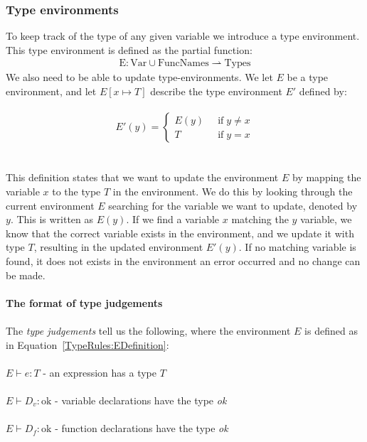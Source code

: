 \subsubsection{Type environments}
To keep track of the type of any given variable we introduce a type environment. This type environment is defined as the partial function:
\begin{align}\label{TypeRules:EDefinition}
    \text{E} : \text{Var} \cup \text{FuncNames} \rightharpoonup \text{Types}
\end{align}
We also need to be able to update type-environments. We let $E$ be a type environment, and let $E[x \mapsto T]$ describe the type environment $E'$ defined by:
\\\\
\begin{equation*}
    E'(y)=
    \begin{cases}
    E(y) \;\; &\text{if} \; y \neq x\\
    T \;\;    &\text{if} \; y = x
    \end{cases}
\end{equation*}
\\\\
This definition states that we want to update the environment $E$ by mapping the variable $x$ to the type $T$ in the environment. We do this by looking through the current environment $E$ searching for the variable we want to update, denoted by $y$. This is written as $E(y)$. If we find a variable $x$ matching the $y$ variable, we know that the correct variable exists in the environment, and we update it with type $T$, resulting in the updated environment $E'(y)$. If no matching variable is found, it does not exists in the environment an error occurred and no change can be made.
\\\\
\textbf{The format of type judgements}
\\\\
The \textit{type judgements} tell us the  following, where the environment $E$ is defined as in Equation~\ref{TypeRules:EDefinition}:
\\\\
$E \vdash e : T$ - an expression has a type $T$
\\\\
$E \vdash D_v : \text{ok}$ - variable declarations have the type \textit{ok}
\\\\
$E \vdash D_f : \text{ok}$ - function declarations have the type \textit{ok}
